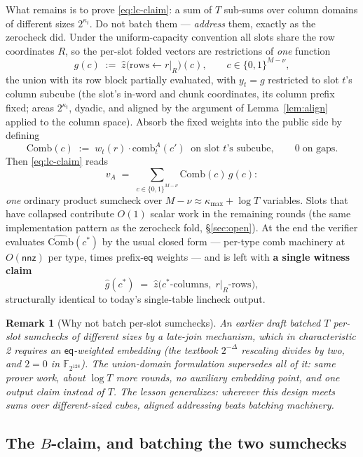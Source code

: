 \documentclass[11pt]{article}
\newcommand{\F}{\mathbb{F}}                       %
\newcommand{\eq}{\mathsf{eq}}
\newcommand{\nnz}{\mathsf{nnz}}
\newtheorem{remark}{Remark}
\theoremstyle{definition}
\begin{document}
What remains is to prove \eqref{eq:lc-claim}: a sum of $T$ sub-sums over
column domains of different sizes $2^{\kappa_t}$. Do not batch them ---
\emph{address} them, exactly as the zerocheck did. Under the
uniform-capacity convention all slots share the row coordinates $R$, so
the per-slot folded vectors are restrictions of \emph{one} function
\[
  g(c) \;:=\; \hat z\bigl(\text{rows} \leftarrow r|_R\bigr)(c),
  \qquad c \in \{0,1\}^{M-\nu},
\]
the union with its row block partially evaluated, with $y_t = g$
restricted to slot $t$'s column subcube (the slot's in-word and chunk
coordinates, its column prefix fixed; areas $2^{\kappa_t}$, dyadic, and
aligned by the argument of Lemma~\ref{lem:align} applied to the column
space). Absorb the fixed weights into the public side by defining
\[
  \mathrm{Comb}(c) \;:=\; w_t(r)\cdot \mathrm{comb}^A_t(c')
  \;\;\text{on slot } t\text{'s subcube}, \qquad 0 \;\text{on gaps}.
\]
Then \eqref{eq:lc-claim} reads
\begin{equation}\label{eq:union-lc}
  v_A \;=\; \sum_{c \in \{0,1\}^{M-\nu}} \mathrm{Comb}(c)\, g(c):
\end{equation}
\emph{one} ordinary product sumcheck over
$M - \nu \approx \kappa_{\max} + \log T$ variables. Slots that have
collapsed contribute $O(1)$ scalar work in the remaining rounds (the same
implementation pattern as the zerocheck fold, \S\ref{sec:open}). At the
end the verifier evaluates $\widehat{\mathrm{Comb}}(c^*)$ by the usual
closed form --- per-type comb machinery at $O(\nnz)$ per type, times
prefix-$\eq$ weights --- and is left with \textbf{a single witness claim}
\[
  \hat g(c^*) \;=\; \hat z\bigl(c^*\text{-columns},\; r|_R\text{-rows}\bigr),
\]
structurally identical to today's single-table lincheck output.

\begin{remark}[Why not batch per-slot sumchecks]\label{rem:char2}
An earlier draft batched $T$ per-slot sumchecks of different sizes by a
late-join mechanism, which in characteristic 2 requires an $\eq$-weighted
embedding (the textbook $2^{-\Delta}$ rescaling divides by two, and
$2 = 0$ in $\F_{2^{128}}$). The union-domain formulation supersedes all of
it: same prover work, about $\log T$ more rounds, no auxiliary embedding
point, and one output claim instead of $T$. The lesson generalizes:
wherever this design meets sums over different-sized cubes, aligned
addressing beats batching machinery.
\end{remark}

\subsection{The \texorpdfstring{$B$}{B}-claim, and batching the two
sumchecks}\label{sec:batchAB}
\end{document}
